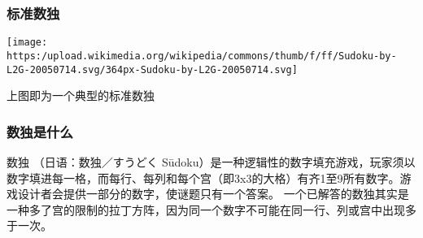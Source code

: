 \documentclass[xcolor=table]{beamer}
\begin{document}
\mdxtitleblockstart{}

\mdxauthorend\mdtitleauthorrunning{}{}\mdxtitleblockend%

\begin{mdframe}%

\frametitle{标准数独}\label{heading-section}%

\begin{mdcenter}%

\noindent{}\texttt{[image: https:/upload.wikimedia.org/wikipedia/commons/thumb/f/ff/Sudoku-by-L2G-20050714.svg/364px-Sudoku-by-L2G-20050714.svg]}{}%

\mdhr{}%

\noindent{}上图即为一个典型的标准数独%
\end{mdcenter}%
\end{mdframe}\label{section}%

\begin{mdframe}%

\frametitle{数独是什么}\label{heading-section}%

\noindent{}数独 （日语：数独／すうどく Sūdoku）是一种逻辑性的数字填充游戏，玩家须以数字填进每一格，而每行、每列和每个宫（即3x3的大格）有齐1至9所有数字。游戏设计者会提供一部分的数字，使谜题只有一个答案。
一个已解答的数独其实是一种多了宫的限制的拉丁方阵，因为同一个数字不可能在同一行、列或宫中出现多于一次。%
\end{mdframe}\label{section}%
\end{document}
